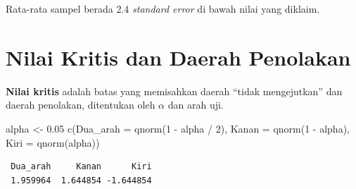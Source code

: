 \documentclass[
  indonesian,
  letterpaper,
]{book}
\newenvironment{Shaded}{\begin{snugshade}}{\end{snugshade}}
\newcommand{\AttributeTok}[1]{\textcolor[rgb]{0.40,0.45,0.13}{#1}}
\newcommand{\DecValTok}[1]{\textcolor[rgb]{0.68,0.00,0.00}{#1}}
\newcommand{\FloatTok}[1]{\textcolor[rgb]{0.68,0.00,0.00}{#1}}
\newcommand{\FunctionTok}[1]{\textcolor[rgb]{0.28,0.35,0.67}{#1}}
\newcommand{\NormalTok}[1]{\textcolor[rgb]{0.00,0.23,0.31}{#1}}
\newcommand{\OtherTok}[1]{\textcolor[rgb]{0.00,0.23,0.31}{#1}}
\newcommand{\SpecialCharTok}[1]{\textcolor[rgb]{0.37,0.37,0.37}{#1}}
\begin{document}
Rata-rata sampel berada 2.4 \emph{standard error} di bawah nilai yang
diklaim.

\section{Nilai Kritis dan Daerah
Penolakan}\label{nilai-kritis-dan-daerah-penolakan}

\textbf{Nilai kritis} adalah batas yang memisahkan daerah ``tidak
mengejutkan'' dan daerah penolakan, ditentukan oleh \(\alpha\) dan arah
uji.

\begin{Shaded}
\begin{Highlighting}[]
\NormalTok{alpha }\OtherTok{\textless{}{-}} \FloatTok{0.05}
\FunctionTok{c}\NormalTok{(}\AttributeTok{Dua\_arah =} \FunctionTok{qnorm}\NormalTok{(}\DecValTok{1} \SpecialCharTok{{-}}\NormalTok{ alpha }\SpecialCharTok{/} \DecValTok{2}\NormalTok{), }\AttributeTok{Kanan =} \FunctionTok{qnorm}\NormalTok{(}\DecValTok{1} \SpecialCharTok{{-}}\NormalTok{ alpha), }\AttributeTok{Kiri =} \FunctionTok{qnorm}\NormalTok{(alpha))}
\end{Highlighting}
\end{Shaded}

\begin{verbatim}
 Dua_arah     Kanan      Kiri 
 1.959964  1.644854 -1.644854 
\end{verbatim}
\end{document}
